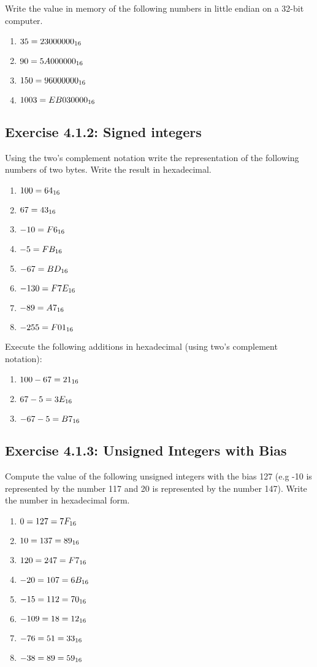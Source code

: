 \documentclass[12pt, a4paper, oneside]{article}
\begin{document}
Write the value in memory of the following numbers in little endian on a 32-bit computer.
\begin{enumerate}[$\bullet$]
  \item $35 \hfill = 23 00 00 00_{16}$
  \item $90 \hfill = 5A 00 00 00_{16}$
  \item $150 \hfill = 96 00 00 00_{16}$
  \item $1003 \hfill = EB 03 00 00_{16}$
\end{enumerate}

\subsection{Exercise 4.1.2: Signed integers}
Using the two's complement notation write the representation of the following numbers of two bytes. Write the result in hexadecimal.
\begin{enumerate}[$\bullet$]
  \item $100 \hfill = 64_{16}$
  \item $67 \hfill = 43_{16}$
  \item $-10 \hfill = F6_{16}$
  \item $-5 \hfill = FB_{16}$
  \item $-67 \hfill = BD_{16}$
  \item $-130 \hfill = F7E_{16}$
  \item $-89 \hfill = A7_{16}$
  \item $-255 \hfill = F01_{16}$
\end{enumerate}

Execute the following additions in hexadecimal (using two's complement notation):
\begin{enumerate}[$\bullet$]
  \item $100 -67 \hfill = 21_{16}$
  \item $67 -5 \hfill = 3E_{16}$
  \item $-67-5 \hfill = B7_{16}$
\end{enumerate}

\subsection{Exercise 4.1.3: Unsigned Integers with Bias}
Compute the value of the following unsigned integers with the bias 127 (e.g -10 is represented by the number 117 and 20 is represented by the number 147). Write the number in hexadecimal form.
\begin{enumerate}
  \item $0 \hfill = 127 = 7F_{16}$
  \item $10 \hfill = 137 = 89_{16}$
  \item $120 \hfill = 247 = F7_{16}$
  \item $-20 \hfill = 107 = 6B_{16}$
  \item $-15 \hfill = 112 = 70_{16}$
  \item $-109 \hfill = 18 = 12_{16}$
  \item $-76 \hfill = 51 = 33_{16}$
  \item $-38 \hfill = 89 = 59_{16}$
\end{enumerate}
\end{document}

